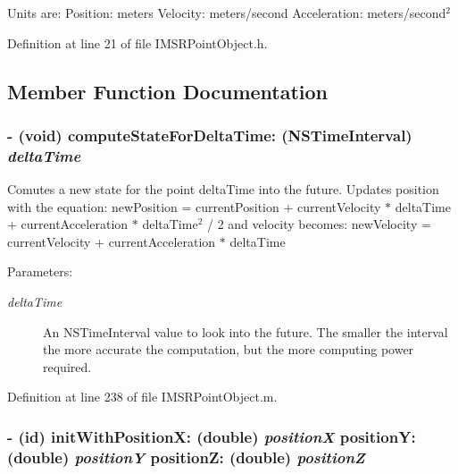 Units are: Position: meters Velocity: meters/second Acceleration: meters/second$^{\mbox{2}}$  

Definition at line 21 of file IMSRPointObject.h.

\subsection{Member Function Documentation}
\hypertarget{interface_i_m_s_r_point_object_ae14396d83b2edd2f34b0bfb0f35a501}{
\subsubsection[{computeStateForDeltaTime:}]{\setlength{\rightskip}{0pt plus 5cm}- (void) computeStateForDeltaTime: (NSTimeInterval) {\em deltaTime}}}
\label{interface_i_m_s_r_point_object_ae14396d83b2edd2f34b0bfb0f35a501}


Comutes a new state for the point deltaTime into the future. Updates position with the equation: newPosition = currentPosition + currentVelocity $\ast$ deltaTime + currentAcceleration $\ast$ deltaTime$^{\mbox{2}}$  / 2 and velocity becomes: newVelocity = currentVelocity + currentAcceleration $\ast$ deltaTime

\begin{Desc}
\item[Parameters:]
\begin{description}
\item[{\em deltaTime}]An NSTimeInterval value to look into the future. The smaller the interval the more accurate the computation, but the more computing power required. \end{description}
\end{Desc}


Definition at line 238 of file IMSRPointObject.m.\hypertarget{interface_i_m_s_r_point_object_603d5f56f6b9344693f108efa3786d79}{
\subsubsection[{initWithPositionX:positionY:positionZ:}]{\setlength{\rightskip}{0pt plus 5cm}- (id) initWithPositionX: (double) {\em positionX}\/ positionY: (double) {\em positionY}\/ positionZ: (double) {\em positionZ}}}
\label{interface_i_m_s_r_point_object_603d5f56f6b9344693f108efa3786d79}


